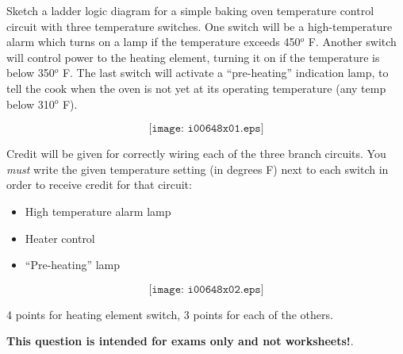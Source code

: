 

Sketch a ladder logic diagram for a simple baking oven temperature control circuit with three temperature switches.  One switch will be a high-temperature alarm which turns on a lamp if the temperature exceeds 450$^{o}$ F.  Another switch will control power to the heating element, turning it on if the temperature is below 350$^{o}$ F.  The last switch will activate a ``pre-heating'' indication lamp, to tell the cook when the oven is not yet at its operating temperature (any temp below 310$^{o}$ F).

$$\texttt{[image: i00648x01.eps]}$$

\vskip 10pt

\noindent
Credit will be given for correctly wiring each of the three branch circuits.  You {\it must} write the given temperature setting (in degrees F) next to each switch in order to receive credit for that circuit:

\begin{itemize}
\item{} High temperature alarm lamp
\item{} Heater control
\item{} ``Pre-heating'' lamp
\end{itemize}







$$\texttt{[image: i00648x02.eps]}$$

4 points for heating element switch, 3 points for each of the others.







{\bf This question is intended for exams only and not worksheets!}.



